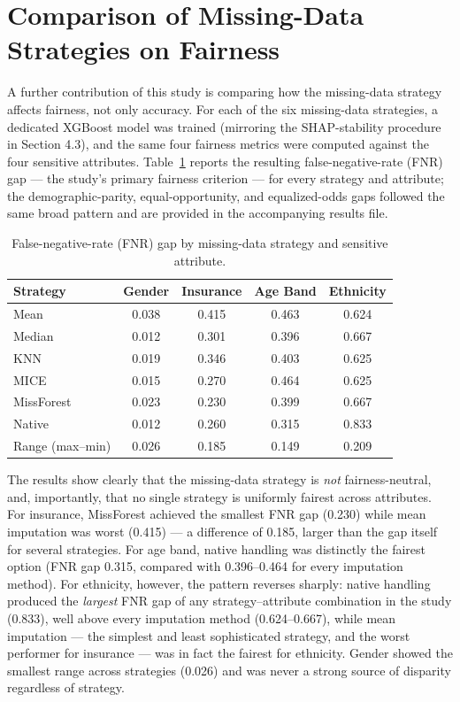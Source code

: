 \documentclass[12pt,a4paper]{report}
\begin{document}
\section{Comparison of Missing-Data Strategies on Fairness}
A further contribution of this study is comparing how the missing-data strategy affects fairness, not only accuracy. For each of the six missing-data strategies, a dedicated XGBoost model was trained (mirroring the SHAP-stability procedure in Section 4.3), and the same four fairness metrics were computed against the four sensitive attributes. Table~\ref{tab:fairness-fnr-allmethods} reports the resulting false-negative-rate (FNR) gap --- the study's primary fairness criterion --- for every strategy and attribute; the demographic-parity, equal-opportunity, and equalized-odds gaps followed the same broad pattern and are provided in the accompanying results file.


\begin{table}[H]
\centering
\caption{False-negative-rate (FNR) gap by missing-data strategy and sensitive attribute.}
\label{tab:fairness-fnr-allmethods}
\begin{tabular}{lcccc}
\toprule
Strategy & Gender & Insurance & Age Band & Ethnicity \\
\midrule
Mean & 0.038 & 0.415 & 0.463 & 0.624 \\
Median & 0.012 & 0.301 & 0.396 & 0.667 \\
KNN & 0.019 & 0.346 & 0.403 & 0.625 \\
MICE & 0.015 & 0.270 & 0.464 & 0.625 \\
MissForest & 0.023 & 0.230 & 0.399 & 0.667 \\
Native & 0.012 & 0.260 & 0.315 & 0.833 \\
\midrule
Range (max--min) & 0.026 & 0.185 & 0.149 & 0.209 \\
\bottomrule
\end{tabular}
\end{table}


The results show clearly that the missing-data strategy is \emph{not} fairness-neutral, and, importantly, that no single strategy is uniformly fairest across attributes. For insurance, MissForest achieved the smallest FNR gap (0.230) while mean imputation was worst (0.415) --- a difference of 0.185, larger than the gap itself for several strategies. For age band, native handling was distinctly the fairest option (FNR gap 0.315, compared with 0.396--0.464 for every imputation method). For ethnicity, however, the pattern reverses sharply: native handling produced the \emph{largest} FNR gap of any strategy--attribute combination in the study (0.833), well above every imputation method (0.624--0.667), while mean imputation --- the simplest and least sophisticated strategy, and the worst performer for insurance --- was in fact the fairest for ethnicity. Gender showed the smallest range across strategies (0.026) and was never a strong source of disparity regardless of strategy.
\end{document}
